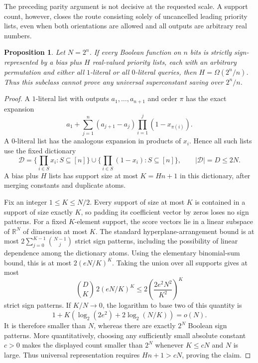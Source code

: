 \documentclass[11pt]{article}
\newtheorem{proposition}[theorem]{Proposition}
\begin{document}
The preceding parity argument is not decisive at the requested scale.
A support count, however, closes the route consisting solely of
uncancelled leading priority lists, even when both orientations are
allowed and all outputs are arbitrary real numbers.

\begin{proposition}\label{prop:mixed-list-universal}
Let $N=2^n$. If every Boolean function on $n$ bits is strictly
sign-represented by a bias plus $H$ real-valued priority lists, each
with an arbitrary permutation and either all $1$-literal or all
$0$-literal queries, then $H=\Omega(2^n/n)$. Thus this subclass cannot
prove any universal superconstant saving over $2^n/n$.
\end{proposition}

\begin{proof}
A $1$-literal list with outputs $a_1,\ldots,a_{n+1}$ and order $\pi$
has the exact expansion
\[
 a_1+\sum_{j=1}^n(a_{j+1}-a_j)
                 \prod_{i=1}^j(1-x_{\pi(i)}).
\]
A $0$-literal list has the analogous expansion in products of $x_i$.
Hence all such lists use the fixed dictionary
\[
 \mathcal D=\{\prod_{i\in S}x_i:S\subseteq[n]\}
       \cup\{\prod_{i\in S}(1-x_i):S\subseteq[n]\},
 \qquad |\mathcal D|=D\leq2N.
\]
A bias plus $H$ lists has support size at most $K=Hn+1$ in this
dictionary, after merging constants and duplicate atoms.

Fix an integer $1\leq K\leq N/2$. Every support of size at most $K$
is contained in a support of size exactly $K$, so padding its coefficient
vector by zeros loses no sign patterns. For a fixed $K$-element
support, the score vectors lie in a linear subspace of $\mathbb R^N$
of dimension at most $K$. The standard hyperplane-arrangement bound
is at most $2\sum_{j=0}^{K-1}\binom{N-1}{j}$ strict sign patterns,
including the possibility of linear dependence among the dictionary
atoms. Using the elementary binomial-sum bound, this is at most
$2(eN/K)^K$. Taking the union over all supports gives at most
\[
 \binom DK\,2(eN/K)^K
       \leq2\left(\frac{2e^2N^2}{K^2}\right)^K
\]
strict sign patterns. If $K/N\longrightarrow0$, the logarithm to
base two of this quantity is
\[
 1+K\left(\log_2(2e^2)+2\log_2(N/K)\right)=o(N).
\]
It is therefore smaller than $N$, whereas there are exactly $2^N$
Boolean sign patterns. More quantitatively, choosing any sufficiently
small absolute constant $c>0$ makes the displayed count smaller than
$2^N$ whenever $K\leq cN$ and $N$ is large. Thus universal
representation requires $Hn+1>cN$, proving the claim.
\end{proof}
\end{document}
